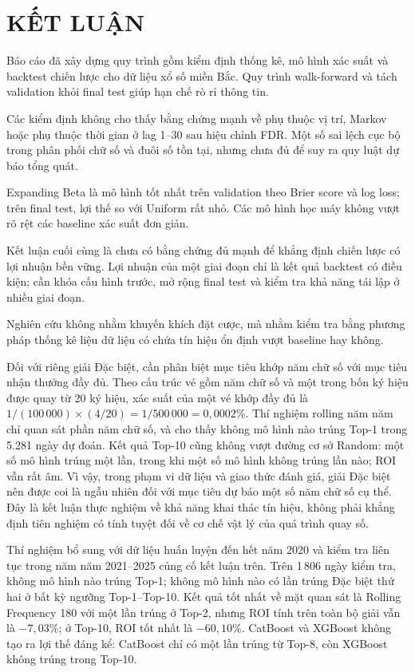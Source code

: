 \chapter{KẾT LUẬN}
Báo cáo đã xây dựng quy trình gồm kiểm định thống kê, mô hình xác suất và backtest chiến lược cho dữ liệu xổ số miền Bắc. Quy trình walk-forward và tách validation khỏi final test giúp hạn chế rò rỉ thông tin.

Các kiểm định không cho thấy bằng chứng mạnh về phụ thuộc vị trí, Markov hoặc phụ thuộc thời gian ở lag 1--30 sau hiệu chỉnh FDR. Một số sai lệch cục bộ trong phân phối chữ số và đuôi số tồn tại, nhưng chưa đủ để suy ra quy luật dự báo tổng quát.

Expanding Beta là mô hình tốt nhất trên validation theo Brier score và log loss; trên final test, lợi thế so với Uniform rất nhỏ. Các mô hình học máy không vượt rõ rệt các baseline xác suất đơn giản.

Kết luận cuối cùng là chưa có bằng chứng đủ mạnh để khẳng định chiến lược có lợi nhuận bền vững. Lợi nhuận của một giai đoạn chỉ là kết quả backtest có điều kiện; cần khóa cấu hình trước, mở rộng final test và kiểm tra khả năng tái lập ở nhiều giai đoạn.

Nghiên cứu không nhằm khuyến khích đặt cược, mà nhằm kiểm tra bằng phương pháp thống kê liệu dữ liệu có chứa tín hiệu ổn định vượt baseline hay không.

Đối với riêng giải Đặc biệt, cần phân biệt mục tiêu khớp năm chữ số với mục tiêu nhận thưởng đầy đủ. Theo cấu trúc vé gồm năm chữ số và một trong bốn ký hiệu được quay từ 20 ký hiệu, xác suất của một vé khớp đầy đủ là $1/(100\,000)\times(4/20)=1/500\,000=0{,}0002\%$. Thí nghiệm rolling năm năm chỉ quan sát phần năm chữ số, và cho thấy không mô hình nào trúng Top-1 trong 5.281 ngày dự đoán. Kết quả Top-10 cũng không vượt đường cơ sở Random: một số mô hình trúng một lần, trong khi một số mô hình không trúng lần nào; ROI vẫn rất âm. Vì vậy, trong phạm vi dữ liệu và giao thức đánh giá, giải Đặc biệt nên được coi là ngẫu nhiên đối với mục tiêu dự báo một số năm chữ số cụ thể. Đây là kết luận thực nghiệm về khả năng khai thác tín hiệu, không phải khẳng định tiên nghiệm có tính tuyệt đối về cơ chế vật lý của quá trình quay số.

Thí nghiệm bổ sung với dữ liệu huấn luyện đến hết năm 2020 và kiểm tra liên tục trong năm năm 2021--2025 củng cố kết luận trên. Trên 1\,806 ngày kiểm tra, không mô hình nào trúng Top-1; không mô hình nào có lần trúng Đặc biệt thứ hai ở bất kỳ ngưỡng Top-1--Top-10. Kết quả tốt nhất về mặt quan sát là Rolling Frequency 180 với một lần trúng ở Top-2, nhưng ROI tính trên toàn bộ giải vẫn là $-7,03\%$; ở Top-10, ROI tốt nhất là $-60,10\%$. CatBoost và XGBoost không tạo ra lợi thế đáng kể: CatBoost chỉ có một lần trúng từ Top-8, còn XGBoost không trúng trong Top-10.

